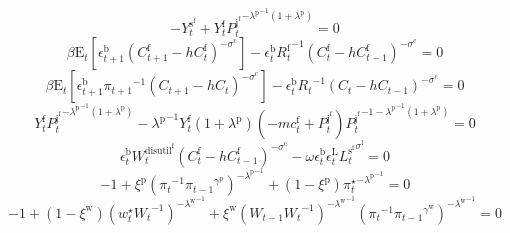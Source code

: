 \begin{equation}
-Y^{\mathrm{s}^{\mathrm{f}}}_{t} + {Y^{\mathrm{f}}_{t}} {{P^{\mathrm{j}^{\mathrm{f}}}_{t}}^{-{\lambda^{\mathrm{p}}}^{-1} \left(1 + \lambda^{\mathrm{p}}\right)}} = 0
\end{equation}
\begin{equation}
{\beta} {\mathrm{E}_{t}\left[{\epsilon^{\mathrm{b}}_{t+1}} {\left(C^{\mathrm{f}}_{t+1} - {h} {C^{\mathrm{f}}_{t}}\right)^{-\sigma^{\mathrm{c}}}}\right]} - {\epsilon^{\mathrm{b}}_{t}} {R^{\mathrm{f}}_{t}}^{-1} {\left(C^{\mathrm{f}}_{t} - {h} {C^{\mathrm{f}}_{t-1}}\right)^{-\sigma^{\mathrm{c}}}} = 0
\end{equation}
\begin{equation}
{\beta} {\mathrm{E}_{t}\left[{\epsilon^{\mathrm{b}}_{t+1}} {\pi_{t+1}}^{-1} {\left(C_{t+1} - {h} {C_{t}}\right)^{-\sigma^{\mathrm{c}}}}\right]} - {\epsilon^{\mathrm{b}}_{t}} {R_{t}}^{-1} {\left(C_{t} - {h} {C_{t-1}}\right)^{-\sigma^{\mathrm{c}}}} = 0
\end{equation}
\begin{equation}
{Y^{\mathrm{f}}_{t}} {{P^{\mathrm{j}^{\mathrm{f}}}_{t}}^{-{\lambda^{\mathrm{p}}}^{-1} \left(1 + \lambda^{\mathrm{p}}\right)}} - {\lambda^{\mathrm{p}}}^{-1} {Y^{\mathrm{f}}_{t}} \left(1 + \lambda^{\mathrm{p}}\right) \left(-{m\!c}^{\mathrm{f}}_{t} + P^{\mathrm{j}^{\mathrm{f}}}_{t}\right) {{P^{\mathrm{j}^{\mathrm{f}}}_{t}}^{-1 - {\lambda^{\mathrm{p}}}^{-1} \left(1 + \lambda^{\mathrm{p}}\right)}} = 0
\end{equation}
\begin{equation}
{\epsilon^{\mathrm{b}}_{t}} {W^{\mathrm{disutil}^{\mathrm{f}}}_{t}} {\left(C^{\mathrm{f}}_{t} - {h} {C^{\mathrm{f}}_{t-1}}\right)^{-\sigma^{\mathrm{c}}}} - {\omega} {\epsilon^{\mathrm{b}}_{t}} {\epsilon^{\mathrm{L}}_{t}} {{L^{\mathrm{s}^{\mathrm{f}}}_{t}}^{\sigma^{\mathrm{l}}}} = 0
\end{equation}
\begin{equation}
-1 + {\xi^{\mathrm{p}}} {\left({\pi_{t}}^{-1} {{\pi_{t-1}}^{\gamma^{\mathrm{p}}}}\right)^{-{\lambda^{\mathrm{p}}}^{-1}}} + \left(1 - \xi^{\mathrm{p}}\right) {{\pi^{\star}_{t}}^{-{\lambda^{\mathrm{p}}}^{-1}}} = 0
\end{equation}
\begin{equation}
-1 + \left(1 - \xi^{\mathrm{w}}\right) {\left({w^{\star}_{t}} {W_{t}}^{-1}\right)^{-{\lambda^{\mathrm{w}}}^{-1}}} + {\xi^{\mathrm{w}}} {\left({W_{t-1}} {W_{t}}^{-1}\right)^{-{\lambda^{\mathrm{w}}}^{-1}}} {\left({\pi_{t}}^{-1} {{\pi_{t-1}}^{\gamma^{\mathrm{w}}}}\right)^{-{\lambda^{\mathrm{w}}}^{-1}}} = 0
\end{equation}

